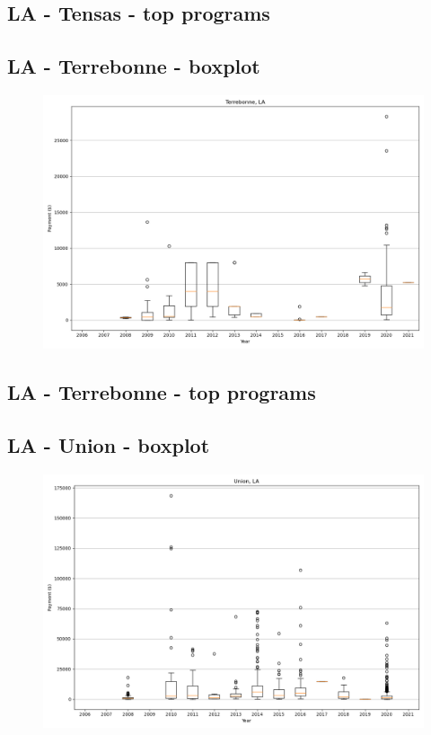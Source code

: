 \subsection*{LA - Tensas - top programs}

\newpage
\subsection*{LA - Terrebonne - boxplot}
\begin{figure}[h]
\centering
\includegraphics[width=7in]{../output/boxplots/counties/Terrebonne-LA_boxplot.png}
\end{figure}


\subsection*{LA - Terrebonne - top programs}

\newpage
\subsection*{LA - Union - boxplot}
\begin{figure}[h]
\centering
\includegraphics[width=7in]{../output/boxplots/counties/Union-LA_boxplot.png}
\end{figure}


